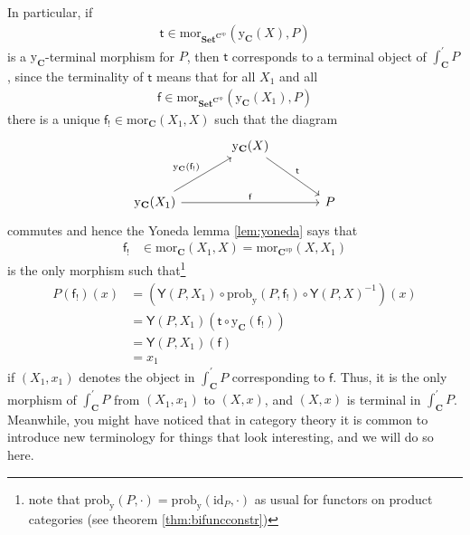 In particular, if
\begin{align*}
  \mathsf{t}
  \in
  \mathrm{mor}_{\mathbf{Set}^{\mathbf{C}^{\mathrm{op}}}}
  (\mathrm{y}_{\mathbf{C}}(X),P)
\end{align*}
is a $\mathrm{y}_{\mathbf{C}}$-terminal morphism for $P$, then $\mathsf{t}$ corresponds to a terminal object of $\int_{\mathbf{C}}^{\prime}P$, since the terminality of $\mathsf{t}$ means that for all $X_{1}$ and all
\begin{align*}
  \mathsf{f}
  \in
  \mathrm{mor}_{\mathbf{Set}^{\mathbf{C}^{\mathrm{op}}}}
  (\mathrm{y}_{\mathbf{C}}(X_{1}),P)
\end{align*}
there is a unique $\mathsf{f}_{!} \in \mathrm{mor}_{\mathbf{C}}(X_{1},X)$ such that the diagram
\[
\begin{tikzcd}[sep=large]
  &
  \mathrm{y}_{\mathbf{C}}(X)
  \arrow{rd}{\mathsf{t}}
  &
  \\
  \mathrm{y}_{\mathbf{C}}(X_{1})
  \arrow{ru}{\mathrm{y}_{\mathbf{C}}(\mathsf{f}_{!})}
  \arrow{rr}{\mathsf{f}}
  &
  &
  P
\end{tikzcd}
\]
commutes and hence the Yoneda lemma \ref{lem:yoneda} says that
\begin{align*}
  \mathsf{f}_{!}
  &\in
  \mathrm{mor}_{\mathbf{C}}(X_{1},X)
  =
  \mathrm{mor}_{\mathbf{C}^{\mathrm{op}}}(X,X_{1})
\end{align*}
is the only morphism such that\footnote{note that $\mathrm{prob}_{\mathrm{y}}(P,\cdot) = \mathrm{prob}_{\mathrm{y}}(\mathrm{id}_{P},\cdot)$ as usual for functors on product categories (see theorem \ref{thm:bifuncconstr})}
\begin{align*}
  P(\mathsf{f}_{!})(x)
  &=
  \left(
    \mathsf{Y}(P,X_{1})
    \circ
    \mathrm{prob}_{\mathrm{y}}(P,\mathsf{f}_{!})
    \circ
    \mathsf{Y}(P,X)^{-1}
  \right)
  (x)
  \\
  &=
  \mathsf{Y}(P,X_{1})
  \left(
    \mathsf{t}
    \circ
    \mathrm{y}_{\mathbf{C}}(\mathsf{f}_{!})
  \right)
  \\
  &=
  \mathsf{Y}(P,X_{1})
  \left(
    \mathsf{f}
  \right)
  \\
  &=
  x_{1}
\end{align*}
if $(X_{1},x_{1})$ denotes the object in $\int_{\mathbf{C}}^{\prime}P$ corresponding to $\mathsf{f}$.
Thus, it is the only morphism of $\int_{\mathbf{C}}^{\prime}P$ from $(X_{1},x_{1})$ to $(X,x)$, and $(X,x)$ is terminal in $\int_{\mathbf{C}}^{\prime}P$.
Meanwhile, you might have noticed that in category theory it is common to introduce new terminology for things that look interesting, and we will do so here.
